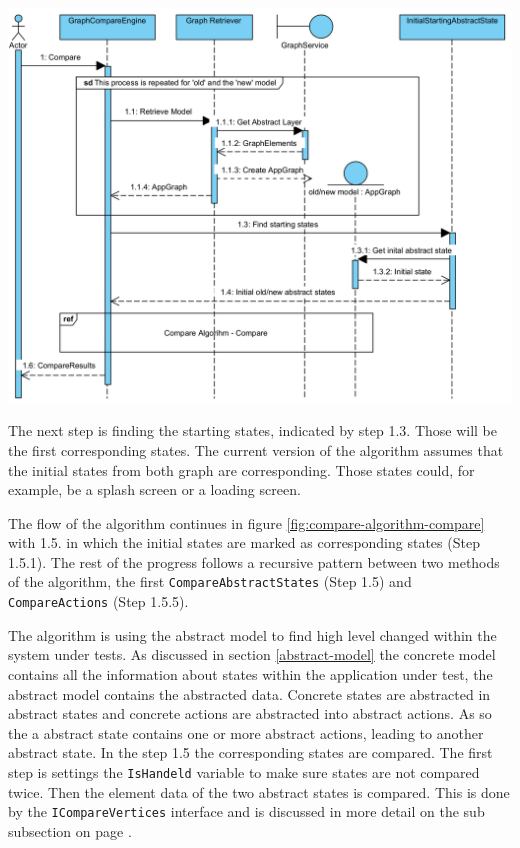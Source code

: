\begingroup
\captionsetup{type=figure}
\includegraphics[scale=0.9]{content/5-Results/Images/Compare-algorithm-start.png}
\label{fig:compare-algorithm-start}
\endgroup

The next step is finding the starting states, indicated by step 1.3. Those will be the first corresponding states. The current version of the algorithm assumes that the initial states from both graph are corresponding. Those states could, for example, be a splash screen or a loading screen.

The flow of the algorithm continues in figure \ref{fig:compare-algorithm-compare} with 1.5. in which the initial states are marked as corresponding states (Step 1.5.1). The rest of the progress follows a recursive pattern between two methods of the algorithm, the first \verb|CompareAbstractStates| (Step 1.5) and \verb|CompareActions| (Step 1.5.5).

The algorithm is using the abstract model to find high level changed within the system under tests. As discussed in section \ref{abstract-model} the concrete model contains all the information about states within the application under test, the abstract model contains the abstracted data. Concrete states are abstracted in abstract states and concrete actions are abstracted into abstract actions. As so the a abstract state contains one or more abstract actions, leading to another abstract state. 
In the step 1.5 the corresponding states are compared. The first step is settings the \verb|IsHandeld| variable to make sure states are not compared twice. Then the element data of the two abstract states is compared. This is done by the \verb|ICompareVertices| interface and is discussed in more detail on the sub subsection on page \pageref{sec:i-compare-vertices}.

